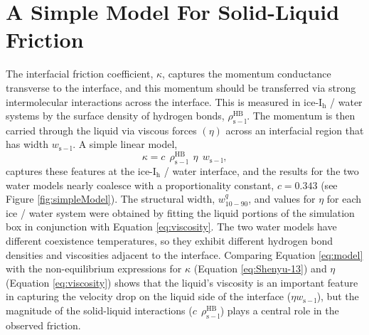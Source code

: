 \section{A Simple Model For Solid-Liquid Friction}
The interfacial friction coefficient, $\kappa$, captures the momentum
conductance transverse to the interface, and this momentum should be
transferred via strong intermolecular interactions across the
interface. This is measured in ice-I$_\mathrm{h}$ / water systems by
the surface density of hydrogen bonds,
$\rho_\mathrm{s-l}^{\mathrm{HB}}$.  The momentum is then carried
through the liquid via viscous forces $(\eta)$ across an interfacial
region that has width $w_\mathrm{s-l}$. A simple linear model,
\begin{equation}
  \kappa = c~~\rho_\mathrm{s-l}^{\mathrm{HB}}~~\eta~~w_\mathrm{s-l},
\label{eq:model}
\end{equation}
captures these features at the ice-I$_\mathrm{h}$ / water interface,
and the results for the two water models nearly coalesce with a
proportionality constant, $c = 0.343$ (see
Figure \ref{fig:simpleModel}).  The structural width,
$w_\mathrm{10-90}^{q}$, and values for $\eta$ for each ice / water
system were obtained by fitting the liquid portions of the simulation
box in conjunction with Equation \eqref{eq:viscosity}.  The two water
models have different coexistence temperatures, so they exhibit
different hydrogen bond densities and viscosities adjacent to the
interface.  Comparing Equation \eqref{eq:model} with the non-equilibrium
expressions for $\kappa$ (Equation \eqref{eq:Shenyu-13}) and $\eta$
(Equation \eqref{eq:viscosity}) shows that the liquid's viscosity is an
important feature in capturing the velocity drop on the liquid side of
the interface ($\eta w_\mathrm{s-l}$), but the magnitude of the
solid-liquid interactions ($c~~\rho_\mathrm{s-l}^{\mathrm{HB}}$) plays a central
role in the observed friction.


